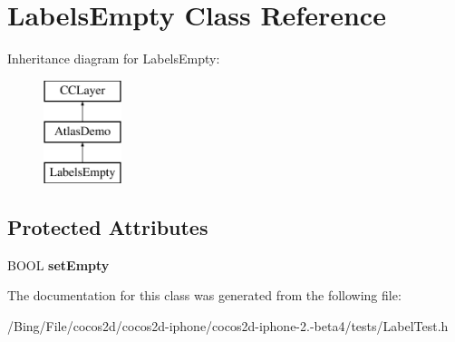 \hypertarget{interface_labels_empty}{\section{Labels\-Empty Class Reference}
\label{interface_labels_empty}
}
Inheritance diagram for Labels\-Empty\-:\begin{figure}[H]
\begin{center}
\leavevmode
\includegraphics[height=3.000000cm]{interface_labels_empty}
\end{center}
\end{figure}
\subsection*{Protected Attributes}
\begin{DoxyCompactItemize}
\item 
\hypertarget{interface_labels_empty_ad1415d387475627ae6ad6e87585b2e64}{B\-O\-O\-L {\bfseries set\-Empty}}\label{interface_labels_empty_ad1415d387475627ae6ad6e87585b2e64}

\end{DoxyCompactItemize}


The documentation for this class was generated from the following file\-:\begin{DoxyCompactItemize}
\item 
/\-Bing/\-File/cocos2d/cocos2d-\/iphone/cocos2d-\/iphone-\/2.-\/beta4/tests/Label\-Test.\-h\end{DoxyCompactItemize}
